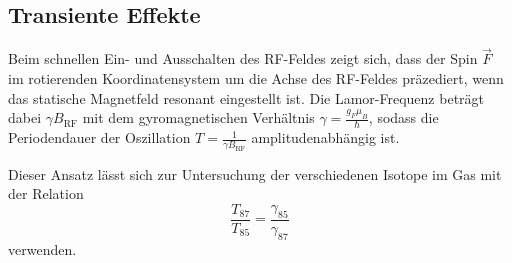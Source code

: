   \subsection{Transiente Effekte}
  \label{subsec:transient}
  Beim schnellen Ein- und Ausschalten des RF-Feldes zeigt sich, dass der Spin $\vec{F}$ im rotierenden Koordinatensystem um die Achse des RF-Feldes präzediert, wenn das statische Magnetfeld resonant eingestellt ist. Die Lamor-Frequenz beträgt dabei $\gamma B_{\text{RF}}$ mit dem gyromagnetischen Verhältnis $\gamma = \frac{g_F \mu_B}{\hbar}$, sodass die Periodendauer der Oszillation $T=\frac{1}{\gamma B_\text{RF}}$ amplitudenabhängig ist.

  Dieser Ansatz lässt sich zur Untersuchung der verschiedenen Isotope im Gas mit der Relation
  \begin{equation}
    \frac{T_{87}}{T_{85}} = \frac{\gamma_{85}}{\gamma_{87}}
    \label{eqn:transient}
  \end{equation}
  verwenden.
